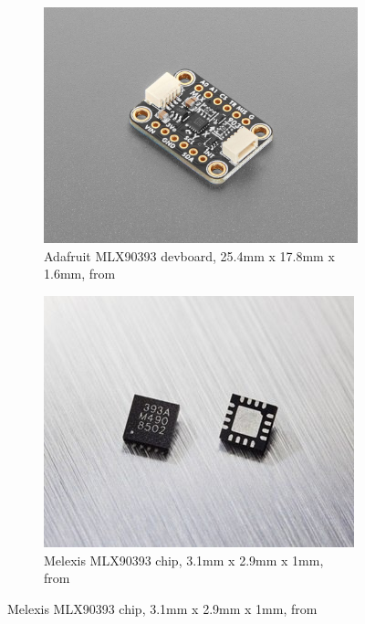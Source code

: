 \begin{figure}[ht]
    \centering
    \begin{subfigure}[b]{0.45\textwidth}
        \centering
        \includegraphics[width=\linewidth]{figures/mlx90393}
        \caption{Adafruit MLX90393 devboard, 25.4mm x 17.8mm x 1.6mm, from~\cite{MLX90393}}
    \end{subfigure}
    \hfill
    \begin{subfigure}[b]{0.45\textwidth}
        \centering
        \includegraphics[width=\linewidth]{figures/mlx90393-chip}
        \caption{Melexis MLX90393 chip, 3.1mm x 2.9mm x 1mm, from~\cite{MLX90393}}
    \end{subfigure}
    \label{fig:sensor}
\end{figure}

